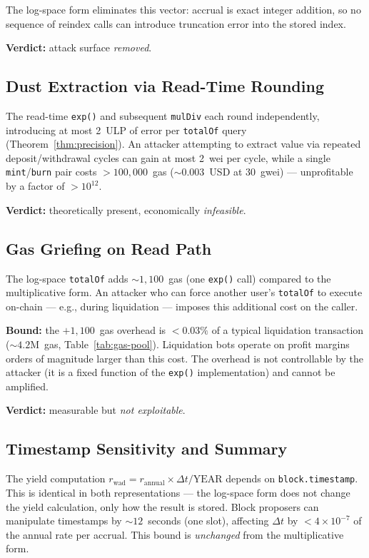 \documentclass[10pt,a4paper,twocolumn]{article}
\theoremstyle{definition}
\theoremstyle{plain}
\theoremstyle{remark}
\begin{document}
The log-space form eliminates this vector: accrual is exact integer addition, so no sequence of reindex calls can introduce truncation error into the stored index.

\textbf{Verdict:} attack surface \emph{removed}.

\subsection{Dust Extraction via Read-Time Rounding}
\label{subsec:dust-attack}

The read-time \texttt{exp()} and subsequent \texttt{mulDiv} each round independently, introducing at most 2~ULP of error per \texttt{totalOf} query (Theorem~\ref{thm:precision}). An attacker attempting to extract value via repeated deposit/withdrawal cycles can gain at most 2~wei per cycle, while a single \texttt{mint}/\texttt{burn} pair costs $>100{,}000$~gas (${\sim}0.003$~USD at 30~gwei) --- unprofitable by a factor of $>10^{12}$.

\textbf{Verdict:} theoretically present, economically \emph{infeasible}.

\subsection{Gas Griefing on Read Path}
\label{subsec:gas-grief}

The log-space \texttt{totalOf} adds ${\sim}1{,}100$~gas (one \texttt{exp()} call) compared to the multiplicative form. An attacker who can force another user's \texttt{totalOf} to execute on-chain --- e.g., during liquidation --- imposes this additional cost on the caller.

\textbf{Bound:} the $+1{,}100$~gas overhead is $<0.03\%$ of a typical liquidation transaction (${\sim}4.2$M~gas, Table~\ref{tab:gas-pool}). Liquidation bots operate on profit margins orders of magnitude larger than this cost. The overhead is not controllable by the attacker (it is a fixed function of the \texttt{exp()} implementation) and cannot be amplified.

\textbf{Verdict:} measurable but \emph{not exploitable}.

\subsection{Timestamp Sensitivity and Summary}
\label{subsec:timestamp}

The yield computation $r_{\text{wad}} = r_{\text{annual}} \times \Delta t / \text{YEAR}$ depends on \texttt{block.timestamp}. This is identical in both representations --- the log-space form does not change the yield calculation, only how the result is stored. Block proposers can manipulate timestamps by ${\sim}12$~seconds (one slot), affecting $\Delta t$ by $< 4 \times 10^{-7}$ of the annual rate per accrual. This bound is \emph{unchanged} from the multiplicative form.
\end{document}
